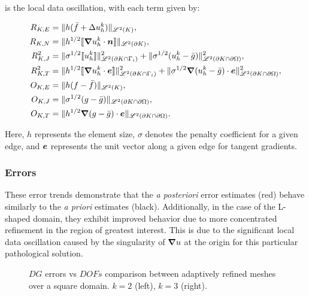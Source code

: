is the local data oscillation, with each term given by:

\begin{align}
	R_{K, E} &= \lVert h (\bar{f} + \Delta u^k_h) \rVert_{\mathscr{L}^2(K)}, \\
	R_{K, N} &= \lVert h^{1/2} \llbracket \bm{\nabla} u^k_h \cdot \bm{n} \rrbracket \rVert_{\mathscr{L}^2(\partial K)}, \\
	R^2_{K, J} &= \lVert \sigma^{1/2} \llbracket u^k_h \rrbracket \rVert^2_{\mathscr{L}^2(\partial K \cap \Gamma_{i})} + \lVert \sigma^{1/2} (u^k_h - \bar{g}) \rVert^2_{\mathscr{L}^2(\partial K \cap \partial \Omega)}, \\
	R^2_{K, T} &= \lVert h^{1/2} \llbracket \bm{\nabla} u^k_h \cdot \bm{e} \rrbracket \rVert^2_{\mathscr{L}^2(\partial K \cap \Gamma_{i})} + \lVert \sigma^{1/2} \bm{\nabla} (u^k_h - \bar{g}) \cdot \bm{e} \rVert^2_{\mathscr{L}^2(\partial K \cap \partial \Omega)}, \\
	O_{K, E} &= \lVert h (f - \bar{f}) \rVert_{\mathscr{L}^2(K)}, \\
	O_{K, J} &= \lVert \sigma^{1/2} (g - \bar{g}) \rVert_{\mathscr{L}^2(\partial K \cap \partial \Omega)}, \\
	O_{K, T} &= \lVert h^{1/2} \bm{\nabla} (g - \bar{g}) \cdot \bm{e} \rVert_{\mathscr{L}^2(\partial K \cap \partial \Omega)}.
\end{align}

Here, $h$ represents the element size, $\sigma$ denotes the penalty coefficient for a given edge, and $\bm{e}$ represents the unit vector along a given edge for tangent gradients.

\newpage
\subsubsection{Errors}

These error trends demonstrate that the \textit{a posteriori} error estimates (red) behave similarly to the \textit{a priori} estimates (black). Additionally, in the case of the L-shaped domain, they exhibit improved behavior due to more concentrated refinement in the region of greatest interest. This is due to the significant local data oscillation caused by the singularity of $\bm{\nabla} u$ at the origin for this particular pathological solution.

\begin{figure}[!ht]
	\begin{subfigure}[b]{0.45\textwidth}
		
	\end{subfigure}
	\hfill
	\begin{subfigure}[b]{0.45\textwidth}
		
	\end{subfigure}
    \caption{$DG$ errors vs $DOFs$ comparison between adaptively refined meshes over a square domain. $k = 2$ (left), $k = 3$ (right).}
\end{figure}


